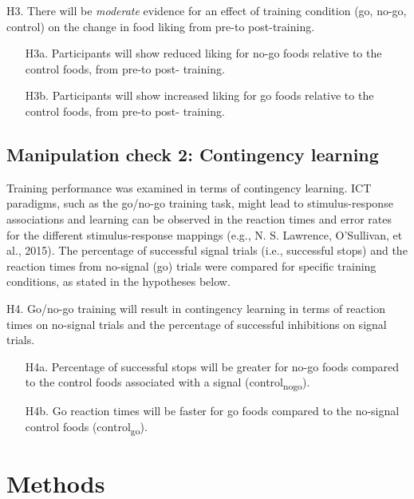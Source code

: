 \documentclass[man,floatsintext]{apa6}
\begin{document}
\noindent H3. There will be \emph{moderate} evidence for an effect of training condition (go, no-go, control) on the change in food liking from pre-to post-training.

\begin{itemize}
\item[H3a.] Participants will show reduced liking for no-go foods relative to the control foods, from pre-to post- training.
\item[H3b.] Participants will show increased liking for go foods relative to the control foods, from pre-to post- training.
\end{itemize}

\hypertarget{manipulation-check-2-contingency-learning}{%
\subsection{Manipulation check 2: Contingency learning}\label{manipulation-check-2-contingency-learning}}

Training performance was examined in terms of contingency learning. ICT paradigms, such as the go/no-go training task, might lead to stimulus-response associations and learning can be observed in the reaction times and error rates for the different stimulus-response mappings (e.g., N. S. Lawrence, O'Sullivan, et al., 2015). The percentage of successful signal trials (i.e., successful stops) and the reaction times from no-signal (go) trials were compared for specific training conditions, as stated in the hypotheses below.

\noindent H4. Go/no-go training will result in contingency learning in terms of reaction times on no-signal trials and the percentage of successful inhibitions on signal trials.

\begin{itemize}
\item[H4a.] Percentage of successful stops will be greater for no-go foods compared to the control foods associated with a signal (control\textsubscript{nogo}).
\item[H4b.] Go reaction times will be faster for go foods compared to the no-signal control foods (control\textsubscript{go}).
\end{itemize}

\hypertarget{methods}{%
\section{Methods}\label{methods}}
\end{document}
